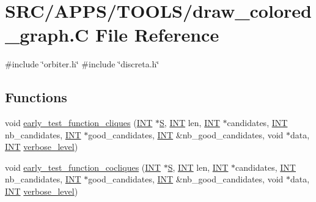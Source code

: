 \hypertarget{draw__colored__graph_8_c}{}\section{S\+R\+C/\+A\+P\+P\+S/\+T\+O\+O\+L\+S/draw\+\_\+colored\+\_\+graph.C File Reference}
\label{draw__colored__graph_8_c}
{\ttfamily \#include \char`\"{}orbiter.\+h\char`\"{}}\newline
{\ttfamily \#include \char`\"{}discreta.\+h\char`\"{}}\newline
\subsection*{Functions}
\begin{DoxyCompactItemize}
\item 
void \mbox{\hyperlink{draw__colored__graph_8_c_a09f78bde7f687bf1bae36dd883bb182a}{early\+\_\+test\+\_\+function\+\_\+cliques}} (\mbox{\hyperlink{galois_8h_a09fddde158a3a20bd2dcadb609de11dc}{I\+NT}} $\ast$\mbox{\hyperlink{simeon_8_c_adab47f8243f1b5a2c31df2535d6b37d0}{S}}, \mbox{\hyperlink{galois_8h_a09fddde158a3a20bd2dcadb609de11dc}{I\+NT}} len, \mbox{\hyperlink{galois_8h_a09fddde158a3a20bd2dcadb609de11dc}{I\+NT}} $\ast$candidates, \mbox{\hyperlink{galois_8h_a09fddde158a3a20bd2dcadb609de11dc}{I\+NT}} nb\+\_\+candidates, \mbox{\hyperlink{galois_8h_a09fddde158a3a20bd2dcadb609de11dc}{I\+NT}} $\ast$good\+\_\+candidates, \mbox{\hyperlink{galois_8h_a09fddde158a3a20bd2dcadb609de11dc}{I\+NT}} \&nb\+\_\+good\+\_\+candidates, void $\ast$data, \mbox{\hyperlink{galois_8h_a09fddde158a3a20bd2dcadb609de11dc}{I\+NT}} \mbox{\hyperlink{simeon_8_c_a818073fbcc2f439e7c56952f67386122}{verbose\+\_\+level}})
\item 
void \mbox{\hyperlink{draw__colored__graph_8_c_a76a03ce559765dd64a7e21f553acb888}{early\+\_\+test\+\_\+function\+\_\+cocliques}} (\mbox{\hyperlink{galois_8h_a09fddde158a3a20bd2dcadb609de11dc}{I\+NT}} $\ast$\mbox{\hyperlink{simeon_8_c_adab47f8243f1b5a2c31df2535d6b37d0}{S}}, \mbox{\hyperlink{galois_8h_a09fddde158a3a20bd2dcadb609de11dc}{I\+NT}} len, \mbox{\hyperlink{galois_8h_a09fddde158a3a20bd2dcadb609de11dc}{I\+NT}} $\ast$candidates, \mbox{\hyperlink{galois_8h_a09fddde158a3a20bd2dcadb609de11dc}{I\+NT}} nb\+\_\+candidates, \mbox{\hyperlink{galois_8h_a09fddde158a3a20bd2dcadb609de11dc}{I\+NT}} $\ast$good\+\_\+candidates, \mbox{\hyperlink{galois_8h_a09fddde158a3a20bd2dcadb609de11dc}{I\+NT}} \&nb\+\_\+good\+\_\+candidates, void $\ast$data, \mbox{\hyperlink{galois_8h_a09fddde158a3a20bd2dcadb609de11dc}{I\+NT}} \mbox{\hyperlink{simeon_8_c_a818073fbcc2f439e7c56952f67386122}{verbose\+\_\+level}})

\end{DoxyCompactItemize}
